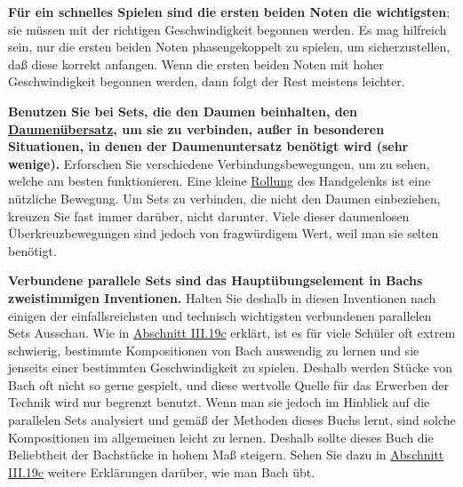 \textbf{Für ein schnelles Spielen sind die ersten beiden Noten die wichtigsten}; sie müssen mit der richtigen Geschwindigkeit begonnen werden.
Es mag hilfreich sein, nur die ersten beiden Noten phasengekoppelt zu spielen, um sicherzustellen, daß diese korrekt anfangen.
Wenn die ersten beiden Noten mit hoher Geschwindigkeit begonnen werden, dann folgt der Rest meistens leichter.

\textbf{Benutzen Sie bei Sets, die den Daumen beinhalten, den \hyperref[c1iii5a]{Daumenübersatz}, um sie zu verbinden, außer in besonderen Situationen, in denen der Daumenuntersatz benötigt wird (sehr wenige).}
Erforschen Sie verschiedene Verbindungsbewegungen, um zu sehen, welche am besten funktionieren.
Eine kleine \hyperref[Rollung]{Rollung} des Handgelenks ist eine nützliche Bewegung.
Um Sets zu verbinden, die nicht den Daumen einbeziehen, kreuzen Sie fast immer darüber, nicht darunter.
Viele dieser daumenlosen Überkreuzbewegungen sind jedoch von fragwürdigem Wert, weil man sie selten benötigt.

\textbf{Verbundene parallele Sets sind das Hauptübungselement in Bachs zweistimmigen Inventionen.}
Halten Sie deshalb in diesen Inventionen nach einigen der einfallsreichsten und technisch wichtigsten verbundenen parallelen Sets Ausschau.
Wie in \hyperref[c1iii19c]{Abschnitt III.19c} erklärt, ist es für viele Schüler oft extrem schwierig, bestimmte Kompositionen von Bach auswendig zu lernen und sie jenseits einer bestimmten Geschwindigkeit zu spielen.
Deshalb werden Stücke von Bach oft nicht so gerne gespielt, und diese wertvolle Quelle für das Erwerben der Technik wird nur begrenzt benutzt.
Wenn man sie jedoch im Hinblick auf die parallelen Sets analysiert und gemäß der Methoden dieses Buchs lernt, sind solche Kompositionen im allgemeinen leicht zu lernen.
Deshalb sollte dieses Buch die Beliebtheit der Bachstücke in hohem Maß steigern.
Sehen Sie dazu in \hyperref[c1iii19c]{Abschnitt III.19c} weitere Erklärungen darüber, wie man Bach übt.

